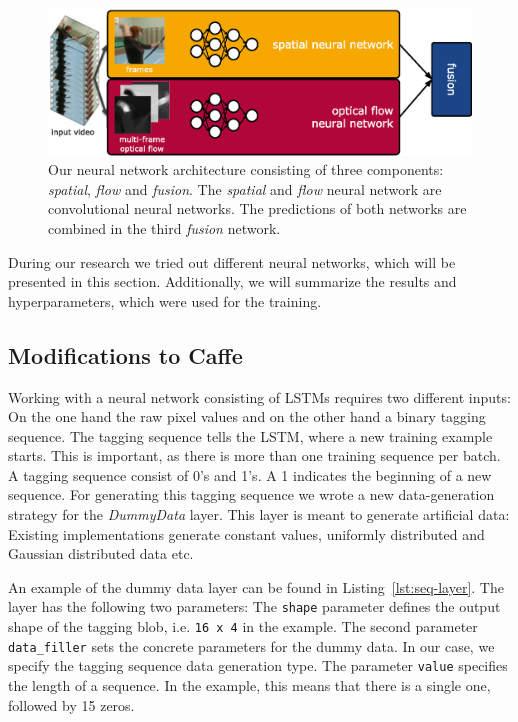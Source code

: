 \begin{figure}[!htb]
	\centering
	\includegraphics[scale=.7]{images/net_architecture.eps}
	\caption{Our neural network architecture consisting of three components: \emph{spatial}, \emph{flow} and \emph{fusion}. The \emph{spatial} and \emph{flow} neural network are convolutional neural networks. The predictions of both networks are combined in the third \emph{fusion} network.}
	\label{fig:architecture}
\end{figure}

During our research we tried out different neural networks, which will be presented in this section.
Additionally, we will summarize the results and hyperparameters, which were used for the training.

\subsection{Modifications to Caffe}

Working with a neural network consisting of LSTMs requires two different inputs:
On the one hand the raw pixel values and on the other hand a binary tagging sequence.
The tagging sequence tells the LSTM, where a new training example starts.
This is important, as there is more than one training sequence per batch.
A tagging sequence consist of 0's and 1's.
A 1 indicates the beginning of a new sequence.
For generating this tagging sequence we wrote a new data-generation strategy for the \emph{DummyData} layer.
This layer is meant to generate artificial data: Existing implementations generate constant values, uniformly distributed and Gaussian distributed data etc.

An example of the dummy data layer can be found in Listing~\ref{lst:seq-layer}.
The layer has the following two parameters:
The \texttt{shape} parameter defines the output shape of the tagging blob, i.e. \texttt{16 x 4} in the example.
The second parameter \texttt{data\_filler} sets the concrete parameters for the dummy data.
In our case, we specify the tagging sequence data generation type.
The parameter \texttt{value} specifies the length of a sequence.
In the example, this means that there is a single one, followed by 15 zeros.

